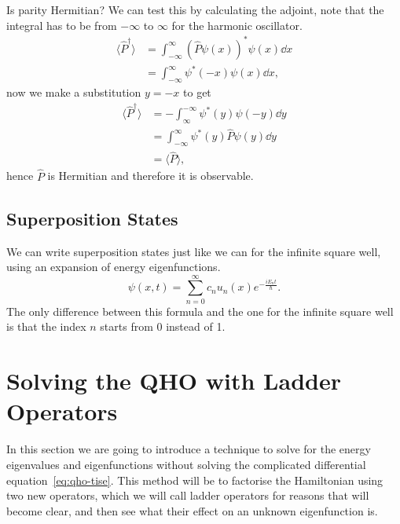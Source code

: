 \documentclass[../quantum_mechanics.tex]{subfiles}
\begin{document}
            Is parity Hermitian?
            We can test this by calculating the adjoint, note that the integral has to be from $-\infty$ to $\infty$ for the harmonic oscillator.
            \begin{align}
                \langle\hat{P}^\dagger\rangle&=\int_{-\infty}^\infty(\hat{P}\psi(x))^\ast\psi(x)\dd{x}\\
                &=\int_{-\infty}^\infty\psi^\ast(-x)\psi(x)\dd{x},
            \end{align}
            now we make a substitution $y=-x$ to get
            \begin{align}
                \langle\hat{P}^\dagger\rangle&=-\int_\infty^{-\infty}\psi^\ast(y)\psi(-y)\dd{y}\\
                &=\int_{-\infty}^\infty\psi^\ast(y)\hat{P}\psi(y)\dd{y}\\
                &=\langle\hat{P}\rangle,
            \end{align}
            hence $\hat{P}$ is Hermitian and therefore it is observable.

        \subsection{Superposition States}\label{chap:harmonic-oscillator:sec:energy-eigenstates:subsec:superposition-states}
            We can write superposition states just like we can for the infinite square well, using an expansion of energy eigenfunctions.
            \begin{equation}
                \psi(x,t)=\sum_{n=0}^\infty c_nu_n(x)e^{-\frac{iE_nt}{\hbar}}.
            \end{equation}
            The only difference between this formula and the one for the infinite square well is that the index $n$ starts from 0 instead of 1.

    \section{Solving the QHO with Ladder Operators}\label{sec:solving-the-qho-with-ladder-operators}
        In this section we are going to introduce a technique to solve for the energy eigenvalues and eigenfunctions without solving the complicated differential equation~\ref{eq:qho-tise}.
        This method will be to factorise the Hamiltonian using two new operators, which we will call ladder operators for reasons that will become clear, and then see what their effect on an unknown eigenfunction is.
\end{document}
